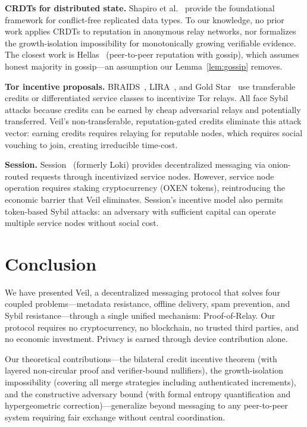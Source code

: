 \documentclass[11pt,a4paper]{article}
\begin{document}
\textbf{CRDTs for distributed state.} Shapiro et al.~\cite{shapiro-crdt} provide the foundational framework for conflict-free replicated data types. To our knowledge, no prior work applies CRDTs to reputation in anonymous relay networks, nor formalizes the growth-isolation impossibility for monotonically growing verifiable evidence. The closest work is Hellas~\cite{hellas} (peer-to-peer reputation with gossip), which assumes honest majority in gossip---an assumption our Lemma~\ref{lem:gossip} removes.

\textbf{Tor incentive proposals.} BRAIDS~\cite{braids}, LIRA~\cite{lira}, and Gold Star~\cite{goldstar} use transferable credits or differentiated service classes to incentivize Tor relays. All face Sybil attacks because credits can be earned by cheap adversarial relays and potentially transferred. Veil's non-transferable, reputation-gated credits eliminate this attack vector: earning credits requires relaying for reputable nodes, which requires social vouching to join, creating irreducible time-cost.

\textbf{Session.} Session~\cite{session} (formerly Loki) provides decentralized messaging via onion-routed requests through incentivized service nodes. However, service node operation requires staking cryptocurrency (OXEN tokens), reintroducing the economic barrier that Veil eliminates. Session's incentive model also permits token-based Sybil attacks: an adversary with sufficient capital can operate multiple service nodes without social cost.


\section{Conclusion}
\label{sec:conclusion}

We have presented Veil, a decentralized messaging protocol that solves four coupled problems---metadata resistance, offline delivery, spam prevention, and Sybil resistance---through a single unified mechanism: Proof-of-Relay. Our protocol requires no cryptocurrency, no blockchain, no trusted third parties, and no economic investment. Privacy is earned through device contribution alone.

Our theoretical contributions---the bilateral credit incentive theorem (with layered non-circular proof and verifier-bound nullifiers), the growth-isolation impossibility (covering all merge strategies including authenticated increments), and the constructive adversary bound (with formal entropy quantification and hypergeometric correction)---generalize beyond messaging to any peer-to-peer system requiring fair exchange without central coordination.
\end{document}

